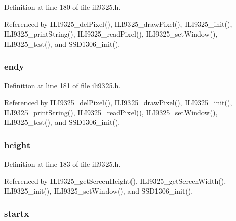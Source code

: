 Definition at line 180 of file ili9325.\-h.



Referenced by I\-L\-I9325\-\_\-del\-Pixel(), I\-L\-I9325\-\_\-draw\-Pixel(), I\-L\-I9325\-\_\-init(), I\-L\-I9325\-\_\-print\-String(), I\-L\-I9325\-\_\-read\-Pixel(), I\-L\-I9325\-\_\-set\-Window(), I\-L\-I9325\-\_\-test(), and S\-S\-D1306\-\_\-init().

\hypertarget{structrect__t_aba63ecb5e6ab30685ab49c247da6f11b}{
\subsubsection[{endy}]{ endy}}\label{structrect__t_aba63ecb5e6ab30685ab49c247da6f11b}


Definition at line 181 of file ili9325.\-h.



Referenced by I\-L\-I9325\-\_\-del\-Pixel(), I\-L\-I9325\-\_\-draw\-Pixel(), I\-L\-I9325\-\_\-init(), I\-L\-I9325\-\_\-print\-String(), I\-L\-I9325\-\_\-read\-Pixel(), I\-L\-I9325\-\_\-set\-Window(), I\-L\-I9325\-\_\-test(), and S\-S\-D1306\-\_\-init().

\hypertarget{structrect__t_a46a3d4708b9b955a65540f1c7f9d47b5}{
\subsubsection[{height}]{ height}}\label{structrect__t_a46a3d4708b9b955a65540f1c7f9d47b5}


Definition at line 183 of file ili9325.\-h.



Referenced by I\-L\-I9325\-\_\-get\-Screen\-Height(), I\-L\-I9325\-\_\-get\-Screen\-Width(), I\-L\-I9325\-\_\-init(), I\-L\-I9325\-\_\-set\-Window(), and S\-S\-D1306\-\_\-init().

\hypertarget{structrect__t_af3a2de9f6c223308dc8c2e6598f8a57c}{
\subsubsection[{startx}]{ startx}}\label{structrect__t_af3a2de9f6c223308dc8c2e6598f8a57c}


